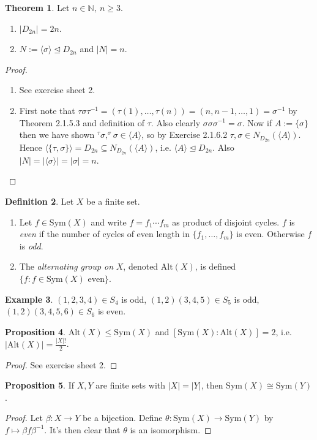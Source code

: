 \documentclass[a4paper]{article}
\newcommand{\Sym}{\text{Sym}}
\newcommand{\Alt}{\text{Alt}}
\theoremstyle{definition}
\newtheorem{defn}{Definition}[subsection]
\newtheorem{prop}[defn]{Proposition}
\newtheorem{thm}[defn]{Theorem}
\newtheorem{example}[defn]{Example}
\begin{document}
\begin{thm}
Let $n\in\mathbb N,\ n\geq 3$.
\begin{enumerate}
\item $|D_{2n}|=2n$.
\item $N:=\langle\sigma\rangle \unlhd D_{2n}$ and $|N|=n$.
\end{enumerate}
\end{thm}
\begin{proof}
\begin{enumerate}
\item See exercise sheet 2.
\item First note that $\tau\sigma\tau^{-1}=(\tau(1),\ldots,\tau(n))=(n,n-1,\ldots,1)=\sigma^{-1}$ by Theorem 2.1.5.3 and definition of $\tau$. Also clearly $\sigma\sigma\sigma^{-1}=\sigma$. Now if $A:=\{\sigma\}$ then we have shown $^\tau \sigma,^\sigma \sigma \in\langle A\rangle$, so by Exercise 2.1.6.2 $\tau,\sigma\in N_{D_{2n}}(\langle A\rangle)$. Hence $\langle\{\tau,\sigma\}\rangle=D_{2n}\subseteq N_{D_{2n}}(\langle A\rangle)$, i.e. $\langle A\rangle \unlhd D_{2n}$. Also $|N|=|\langle \sigma\rangle|=|\sigma|=n$.
\end{enumerate}
\end{proof}

\begin{defn}
Let $X$ be a finite set.
\begin{enumerate}
\item Let $f\in\Sym(X)$ and write $f=f_1\cdots f_m$ as product of disjoint cycles. $f$ is \textit{even} if the number of cycles of even length in $\{f_1,\ldots,f_m\}$ is even. Otherwise $f$ is \textit{odd}.
\item The \textit{alternating group on} $X$, denoted $\Alt(X)$, is defined $\{f:f\in\Sym(X)\text{ even}\}$.
\end{enumerate}
\end{defn}
\begin{example}
$(1,2,3,4)\in S_4$ is odd, $(1,2)(3,4,5)\in S_5$ is odd, $(1,2)(3,4,5,6)\in S_6$ is even.
\end{example}

\begin{prop}
$\Alt(X)\leq \Sym(X)$ and $[\Sym(X):\Alt(X)]=2$, i.e. $|\Alt(X)|=\frac{|X|!}{2}$.
\end{prop}
\begin{proof}
See exercise sheet 2.
\end{proof}

\begin{prop}
If $X,Y$ are finite sets with $|X|=|Y|$, then $\Sym(X)\cong\Sym(Y)$.
\end{prop}
\begin{proof}
Let $\beta:X\rightarrow Y$ be a bijection. Define $\theta:\Sym(X)\rightarrow\Sym(Y)$ by $f\mapsto \beta f\beta^{-1}$. It's then clear that $\theta$ is an isomorphism.
\end{proof}
\end{document}
